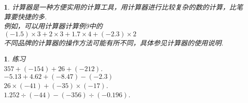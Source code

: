 \documentclass[11pt]{article}
\newtheorem{exercise}{ }
\newtheorem{article}{ }
\begin{document}
\begin{article}
    计算器是一种方便实用的计算工具，用计算器进行比较复杂的数的计算，比笔算要快捷的多.\\
    例如，可以用计算器计算例9中的\\
    $(-1.5)\times3+2\times3+1.7\times4+(-2.3)\times2$\\
    不同品牌的计算器的操作方法可能有所不同，具体参见计算器的使用说明.\\
\end{article}

\begin{exercise}
练习\\
$357+(-154)+26+(-212)$.\\
$-5.13+4.62+(-8.47)-(-2.3)$\\
$26\times(-41)+(-35)\times(-17)$.\\
$1.252\div(-44)-(-356)\div(-0.196)$.\\
\end{exercise}
\end{document}
